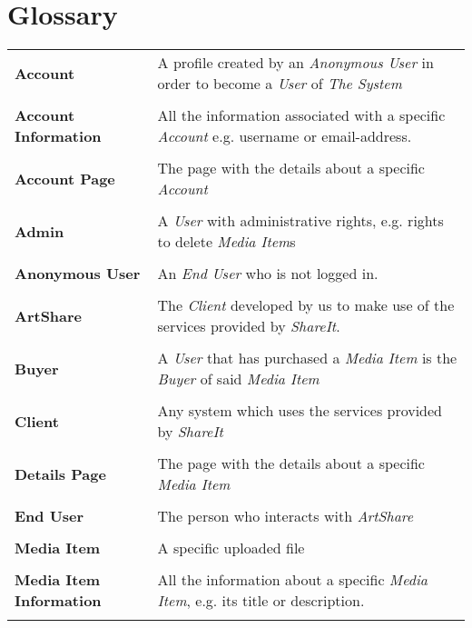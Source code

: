 \documentclass[../report.tex]{subfiles}
\begin{document}
\section{Glossary}
\begin{longtable}{l p{10 cm}}
\textbf{Account} & A profile created by an \textit{Anonymous User} in order to become a \textit{User} of \textit{The System} \\ \\
\textbf{Account Information} & All the information associated with a specific \textit{Account} e.g. username or email-address.\\ \\
\textbf{Account Page} & The page with the details about a specific \textit{Account} \\ \\
\textbf{Admin} & A \textit{User} with administrative rights, e.g. rights to delete \textit{Media Item}s\\ \\
\textbf{Anonymous User} & An \textit{End User} who is not logged in.\\ \\
\textbf{ArtShare} & The \textit{Client} developed by us to make use of the services provided by \textit{ShareIt}. \\ \\
\textbf{Buyer} & A \textit{User} that has purchased a \textit{Media Item} is the \textit{Buyer} of said \textit{Media Item} \\ \\
\textbf{Client} & Any system which uses the services provided by \textit{ShareIt} \\ \\
\textbf{Details Page} & The page with the details about a specific \textit{Media Item} \\ \\
\textbf{End User} & The person who interacts with \textit{ArtShare} \\ \\
\textbf{Media Item} & A specific uploaded file \\ \\
\textbf{Media Item Information} & All the information  about a specific \textit{Media Item}, e.g. its title or description. \\ \\

\end{longtable}
\end{document}
